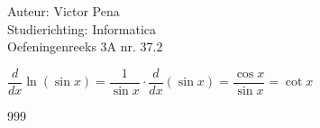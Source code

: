 \documentclass[a4paper]{article}
\begin{document}
	
	\noindent \large Auteur: Victor Pena \\
	\noindent \large Studierichting: Informatica\\
	\noindent \large Oefeningenreeks 3A nr. 37.2\\
	
	\medskip
	
	\normalsize 
	$\dfrac{d}{dx}\ln \left(\sin x\right) = \dfrac{1}{\sin x}\cdot\dfrac{d}{dx}\left(\sin x\right) = \dfrac{\cos x}{\sin x} = \cot x$
	
	
	\begin{thebibliography}{999}
	\end{thebibliography}
\end{document}
